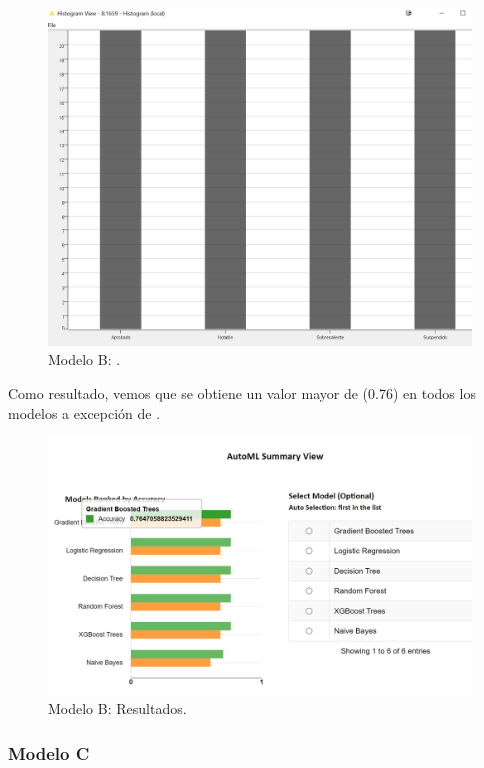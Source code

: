\begin{figure}[!htb]
	\centering
	\includegraphics[width=1\textwidth]{img/workflowB2.png}
	\caption{Modelo B: .}
	\label{fig:workflowB2}
\end{figure}
\FloatBarrier

Como resultado, vemos que se obtiene un valor mayor de  (0.76) en todos los modelos a excepción de . 

\begin{figure}[!htb]
	\centering
	\includegraphics[width=1\textwidth]{img/workflowB3.png}
	\caption{Modelo B: Resultados.}
	\label{fig:workflowB3}
\end{figure}
\FloatBarrier

\subsubsection{Modelo C}

